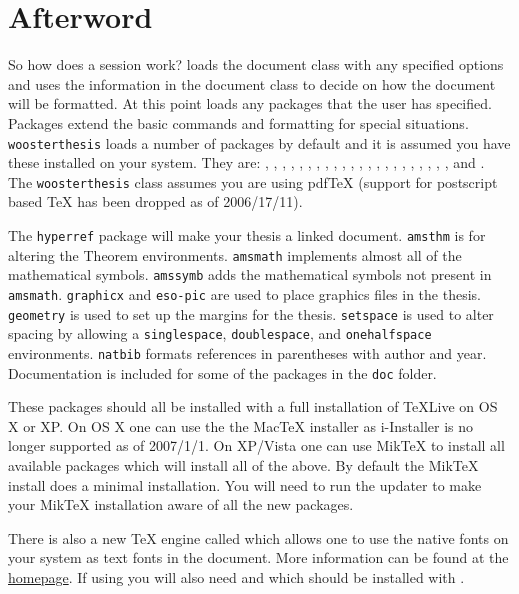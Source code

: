 \chapter*{Afterword}\label{after}
So how does a \lt session work? \lt loads the document class with any specified options and uses the information in the document class to decide on how the document will be formatted. At this point \lt loads any packages that the user has specified. Packages extend the basic \lt commands and formatting for special situations. \verb|woosterthesis| loads a number of packages by default and it is assumed you have these installed on your system. They are:
,
,
,
,
,
,
,
,
,
,
,
,
,
,
,
,
,
,
,
,
,
,
and .
The \texttt{woosterthesis} class assumes you are using pdfTeX (support for postscript based TeX has been dropped as of 2006/17/11).

The \texttt{hyperref} package will make your thesis a linked document. \texttt{amsthm} is for altering the Theorem environments. \texttt{amsmath} implements almost all of the mathematical symbols. \texttt{amssymb} adds the mathematical symbols not present in \texttt{amsmath}. \texttt{graphicx} and \texttt{eso-pic} are used to place graphics files in the thesis. \texttt{geometry} is used to set up the margins for the thesis. \texttt{setspace} is used to alter spacing by allowing a \texttt{singlespace}, \texttt{doublespace}, and \texttt{onehalfspace} environments. \texttt{natbib} formats references in parentheses with author and year.  Documentation is included for some of the packages in the \verb|doc| folder.

These packages should all be installed with a full installation of TeXLive on OS X or XP. On OS X one can use the the MacTeX installer as i-Installer is no longer supported as of 2007/1/1. On XP/Vista one can use MikTeX to install all available packages which will install all of the above. By default the MikTeX install does a minimal installation. You will need to run the updater to make your MikTeX installation aware of all the new packages.

There is also a new \TeX{} engine called \xt which allows one to use the native fonts on your system as text fonts in the document. More information can be found at the \href{http://scripts.sil.org/cms/scripts/page.php?site_id=nrsi&id=xetex}{\xt homepage}. If using \xt you will also need  and  which should be installed with \xt.

